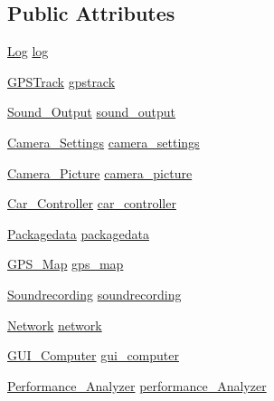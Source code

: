\subsection*{Public Attributes}
\begin{DoxyCompactItemize}
\item 
\hyperlink{class_model_1_1_log}{Log} \hyperlink{class_controller_1_1_controller___computer_a85f86c847a875759b91468de9a0ef660}{log}
\item 
\hyperlink{class_model_1_1_g_p_s_track}{G\+P\+S\+Track} \hyperlink{class_controller_1_1_controller___computer_a7fa4a837e842a8a2b6dc06dee6c41fda}{gpstrack}
\item 
\hyperlink{class_controller_1_1_sound___output}{Sound\+\_\+\+Output} \hyperlink{class_controller_1_1_controller___computer_a329b74f7beba3ccdc75f710809c12ae7}{sound\+\_\+output}
\item 
\hyperlink{class_controller_1_1_camera___settings}{Camera\+\_\+\+Settings} \hyperlink{class_controller_1_1_controller___computer_a17e242bf1bb5365200e81ff38355edae}{camera\+\_\+settings}
\item 
\hyperlink{class_controller_1_1_camera___picture}{Camera\+\_\+\+Picture} \hyperlink{class_controller_1_1_controller___computer_a2df102057f048728b9f28a0f4a6f877f}{camera\+\_\+picture}
\item 
\hyperlink{class_controller_1_1_car___controller}{Car\+\_\+\+Controller} \hyperlink{class_controller_1_1_controller___computer_af7e840064853f11b780709888b6b0d16}{car\+\_\+controller}
\item 
\hyperlink{class_controller_1_1_packagedata}{Packagedata} \hyperlink{class_controller_1_1_controller___computer_ae7ae8b19c54572babe3f871a2407b6d2}{packagedata}
\item 
\hyperlink{class_controller_1_1_g_p_s___map}{G\+P\+S\+\_\+\+Map} \hyperlink{class_controller_1_1_controller___computer_a1d5a180050e34b6cc5fe2fd496715913}{gps\+\_\+map}
\item 
\hyperlink{class_controller_1_1_soundrecording}{Soundrecording} \hyperlink{class_controller_1_1_controller___computer_a95c55f8f9f0ca133e4638d5654bfe88d}{soundrecording}
\item 
\hyperlink{class_controller_1_1_network}{Network} \hyperlink{class_controller_1_1_controller___computer_a2241ad6cbbffc0074307a18fa9381c4f}{network}
\item 
\hyperlink{class_view_1_1_g_u_i___computer}{G\+U\+I\+\_\+\+Computer} \hyperlink{class_controller_1_1_controller___computer_a7540f0f7095d34ea29acbaf94cbf34e7}{gui\+\_\+computer}
\item 
\hyperlink{class_controller_1_1_performance___analyzer}{Performance\+\_\+\+Analyzer} \hyperlink{class_controller_1_1_controller___computer_af8928aa423ec277d4438e8a8b68ed2a7}{performance\+\_\+\+Analyzer}
\end{DoxyCompactItemize}


